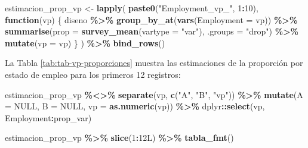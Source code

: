\documentclass[
  spanish,
  12pt,
]{book}
\newenvironment{Shaded}{\begin{snugshade}}{\end{snugshade}}
\newcommand{\AttributeTok}[1]{\textcolor[rgb]{0.13,0.29,0.53}{#1}}
\newcommand{\ConstantTok}[1]{\textcolor[rgb]{0.56,0.35,0.01}{#1}}
\newcommand{\ControlFlowTok}[1]{\textcolor[rgb]{0.13,0.29,0.53}{\textbf{#1}}}
\newcommand{\DataTypeTok}[1]{\textcolor[rgb]{0.13,0.29,0.53}{#1}}
\newcommand{\DecValTok}[1]{\textcolor[rgb]{0.00,0.00,0.81}{#1}}
\newcommand{\FunctionTok}[1]{\textcolor[rgb]{0.13,0.29,0.53}{\textbf{#1}}}
\newcommand{\NormalTok}[1]{#1}
\newcommand{\OtherTok}[1]{\textcolor[rgb]{0.56,0.35,0.01}{#1}}
\newcommand{\SpecialCharTok}[1]{\textcolor[rgb]{0.81,0.36,0.00}{\textbf{#1}}}
\newcommand{\StringTok}[1]{\textcolor[rgb]{0.31,0.60,0.02}{#1}}
\begin{document}
\begin{Shaded}
\begin{Highlighting}[]
\NormalTok{estimacion\_prop\_vp }\OtherTok{\textless{}{-}} \FunctionTok{lapply}\NormalTok{(}
  \FunctionTok{paste0}\NormalTok{(}\StringTok{"Employment\_vp\_"}\NormalTok{, }\DecValTok{1}\SpecialCharTok{:}\DecValTok{10}\NormalTok{),}
  \ControlFlowTok{function}\NormalTok{(vp) \{}
\NormalTok{    diseno }\SpecialCharTok{\%\textgreater{}\%}
      \FunctionTok{group\_by\_at}\NormalTok{(}\FunctionTok{vars}\NormalTok{(}\AttributeTok{Employment =}\NormalTok{ vp)) }\SpecialCharTok{\%\textgreater{}\%}
      \FunctionTok{summarise}\NormalTok{(}\AttributeTok{prop =} \FunctionTok{survey\_mean}\NormalTok{(}\AttributeTok{vartype =} \StringTok{"var"}\NormalTok{), }\AttributeTok{.groups =} \StringTok{"drop"}\NormalTok{) }\SpecialCharTok{\%\textgreater{}\%}
      \FunctionTok{mutate}\NormalTok{(}\AttributeTok{vp =}\NormalTok{ vp)}
\NormalTok{  \}}
\NormalTok{) }\SpecialCharTok{\%\textgreater{}\%} \FunctionTok{bind\_rows}\NormalTok{()}
\end{Highlighting}
\end{Shaded}

La Tabla \ref{tab:tab-vp-proporciones} muestra las estimaciones de la proporción por estado de empleo para los primeros 12 registros:

\begin{Shaded}
\begin{Highlighting}[]
\NormalTok{estimacion\_prop\_vp }\SpecialCharTok{\%\textless{}\textgreater{}\%}
  \FunctionTok{separate}\NormalTok{(vp, }\FunctionTok{c}\NormalTok{(}\StringTok{"A"}\NormalTok{, }\StringTok{"B"}\NormalTok{, }\StringTok{"vp"}\NormalTok{)) }\SpecialCharTok{\%\textgreater{}\%}
  \FunctionTok{mutate}\NormalTok{(}\AttributeTok{A =} \ConstantTok{NULL}\NormalTok{, }\AttributeTok{B =} \ConstantTok{NULL}\NormalTok{, }\AttributeTok{vp =} \FunctionTok{as.numeric}\NormalTok{(vp)) }\SpecialCharTok{\%\textgreater{}\%}
\NormalTok{  dplyr}\SpecialCharTok{::}\FunctionTok{select}\NormalTok{(vp, Employment}\SpecialCharTok{:}\NormalTok{prop\_var)}
\end{Highlighting}
\end{Shaded}

\begin{Shaded}
\begin{Highlighting}[]
\NormalTok{estimacion\_prop\_vp }\SpecialCharTok{\%\textgreater{}\%} \FunctionTok{slice}\NormalTok{(}\DecValTok{1}\SpecialCharTok{:}\DecValTok{12}\DataTypeTok{L}\NormalTok{) }\SpecialCharTok{\%\textgreater{}\%} \FunctionTok{tabla\_fmt}\NormalTok{()}
\end{Highlighting}
\end{Shaded}
\end{document}
